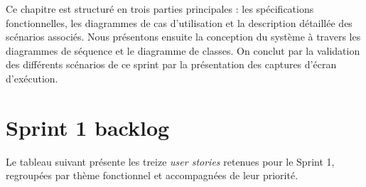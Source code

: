 \documentclass[a4paper,12pt]{report}
\begin{document}
Ce chapitre est structuré en trois parties principales : les spécifications fonctionnelles, les diagrammes de cas d’utilisation et la description détaillée des scénarios associés. Nous présentons ensuite la conception du système à travers les diagrammes de séquence et le diagramme de classes. On conclut par la validation des différents scénarios de ce sprint par la présentation des captures d’écran d’exécution.
\\

\section{Sprint 1 backlog}


Le tableau suivant présente les treize \textit{user stories}  retenues pour le Sprint 1, regroupées
par thème fonctionnel et accompagnées de leur priorité.
\end{document}
